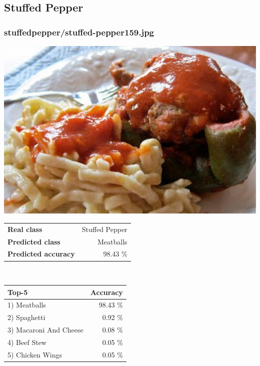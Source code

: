 \subsection{Stuffed Pepper}
    
\subsubsection{stuffed\textunderscore pepper/stuffed-pepper159.jpg}

\begin{minipage}[t]{0.4\textwidth}
	\vspace{0pt}
	\includegraphics[width=\linewidth]{images/evaluation-images/stuffed_pepper/stuffed-pepper159.jpg}
\end{minipage}
\hfill
\begin{minipage}[t]{0.5\textwidth}
	\vspace{0pt}\raggedright
	\begin{tabularx}{\textwidth}{X r}
		\small \textbf{Real class} & \small Stuffed Pepper\\
		\small \textbf{Predicted class} & \small Meatballs\\
		\small \textbf{Predicted accuracy} & \small 98.43 \%
    \end{tabularx}\\
    
    \vspace{6pt}
	\begin{tabularx}{\textwidth}{X r}
        \small \textbf{Top-5} & \small \textbf{Accuracy} \\
        \hline
		\small 1) Meatballs & \small 98.43 \%\\\small 2) Spaghetti & \small 0.92 \%\\\small 3) Macaroni And Cheese & \small 0.08 \%\\\small 4) Beef Stew & \small 0.05 \%\\\small 5) Chicken Wings & \small 0.05 \%
    \end{tabularx}
\end{minipage}
    
